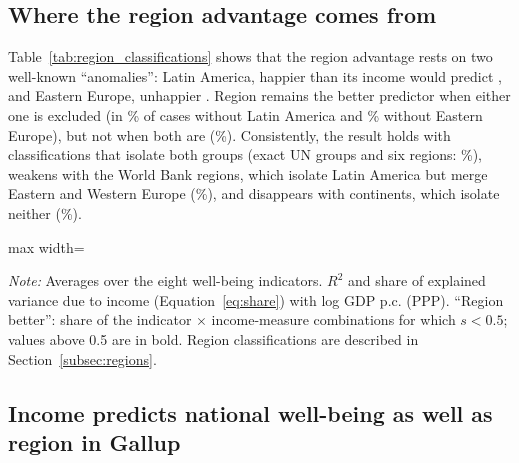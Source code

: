 \documentclass[12pt]{article}
\begin{document}
\subsection{Where the region advantage comes from}\label{subsec:region_limits}

Table~\ref{tab:region_classifications} shows that the region advantage rests on two well-known ``anomalies'': Latin America, happier than its income would predict \citep{graham_paradox_2009,rojas_handbook_2016}, and Eastern Europe, unhappier \citep{guriev_unhappiness_2009}. Region remains the better predictor when either one is excluded (in \shareRegionBetterNoLatam\% of cases without Latin America and \shareRegionBetterNoEE\% without Eastern Europe), but not when both are (\shareRegionBetterNoLatamEE\%). Consistently, the result holds with classifications that isolate both groups (exact UN groups and six regions: \shareRegionBetterUN\%), weakens with the World Bank regions, which isolate Latin America but merge Eastern and Western Europe (\shareRegionBetterWB\%), and disappears with continents, which isolate neither (\shareRegionBetterContinents\%). %

\begin{table}[htbp]
    \centering
    \caption{Income vs.\ region by region classification and without Latin America or Eastern Europe (WVS/EVS).}\label{tab:region_classifications}
    \begin{adjustbox}{max width=\textwidth}
    
    \end{adjustbox}
    \begin{minipage}{\textwidth}\footnotesize \textit{Note:} Averages over the eight well-being indicators. $R^2$ and share of explained variance due to income (Equation~\eqref{eq:share}) with log GDP p.c. (PPP). ``Region better'': share of the indicator $\times$ income-measure combinations for which $s < 0.5$; values above 0.5 are in bold. Region classifications are described in Section~\ref{subsec:regions}.\end{minipage}
\end{table}

\subsection{Income predicts national well-being as well as region in Gallup}\label{subsec:gallup_results}
\end{document}
